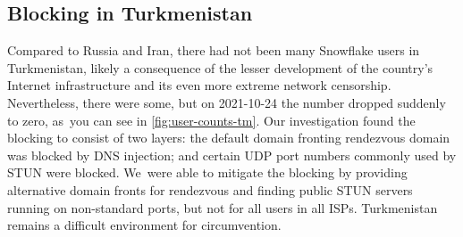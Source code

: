 \documentclass[letterpaper,twocolumn]{article}
\begin{document}
%
%
%

\subsection{Blocking in Turkmenistan}
\label{sec:block-tm}



Compared to Russia and Iran,
there had not been many Snowflake users in Turkmenistan,
likely a consequence of the lesser development
of the country's Internet infrastructure
and its even more extreme network censorship.
Nevertheless, there were some,
but on \mbox{2021-10-24} the number dropped suddenly to zero,
as~you can see in \autoref{fig:user-counts-tm}.
Our investigation found the blocking to consist of two layers:
the default domain fronting rendezvous domain was blocked
by DNS injection;
and certain UDP port numbers commonly used by STUN were blocked.
We~were able to mitigate the blocking
by providing alternative domain fronts for rendezvous
and finding public STUN servers running on non-standard ports,
but not for all users in all ISPs.
Turkmenistan remains a difficult environment for circumvention.
\end{document}

